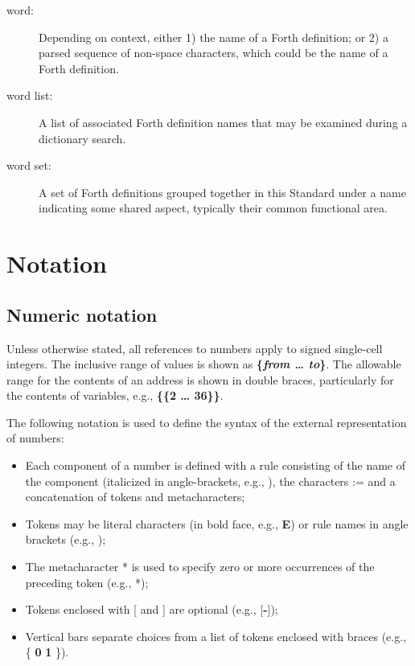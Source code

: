 \begin{description}
\item[word:]
	Depending on context, either
	1) the name of a Forth definition; or
	2) a parsed sequence of non-space characters,
	which could be the name of a Forth definition.

\item[word list:]
	A list of associated Forth definition names that may be examined
	during a dictionary search.

\item[word set:]
	A set of Forth definitions grouped together in this Standard
	under a name indicating some shared aspect, typically their
	common functional area.
\end{description}

\section{Notation} %
\label{notations}

\subsection{Numeric notation}
\label{notation:numeric}

Unless otherwise stated, all references to numbers apply to signed
single-cell integers. The inclusive range of values is shown as
\textbf{\{\textit{from {\ldots} to}\}}. The allowable range for the
contents of an address is shown in double braces, particularly for
the contents of variables,
e.g.,  \textbf{\{\{2 {\ldots} 36\}\}}.

The following notation is used to define the syntax of the external
representation of numbers:

\begin{itemize}
\item Each component of a number is defined with a rule consisting
	of the name of the component (italicized in angle-brackets,
	e.g., ), the characters \textsf{:=} and a concatenation
	of tokens and metacharacters;

\item Tokens may be literal characters (in bold face, e.g.,
	\textbf{E}) or rule names in angle brackets (e.g.,
	\linebreak {});

\item The metacharacter * is used to specify zero or more occurrences of
	the preceding token (e.g., *);

\item Tokens enclosed with [ and ] are optional (e.g., [\textbf{-}]);

\item Vertical bars separate choices from a list of tokens enclosed
	with braces (e.g., \{ \textbf{0} {\textbar} \textbf{1} \}).
\end{itemize}


